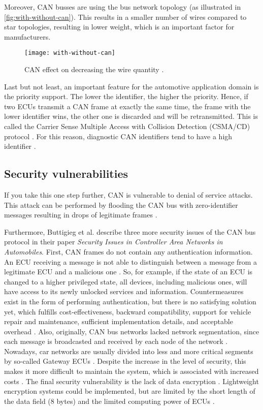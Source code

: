 Moreover, CAN busses are using the bus network topology (as illustrated in \autoref{fig:with-without-can}). This results in a smaller number of wires compared to star topologies, resulting in lower weight, which is an important factor for manufacturers.

\begin{figure}[htb]
    \centering
    \texttt{[image: with-without-can]}
    \caption{CAN effect on decreasing the wire quantity \cite{Sharma2016}.}
    \label{fig:with-without-can}
\end{figure}

Last but not least, an important feature for the automotive application domain is the priority support. The lower the identifier, the higher the priority. Hence, if two ECUs transmit a CAN frame at exactly the same time, the frame with the lower identifier wins, the other one is discarded and will be retransmitted. This is called the Carrier Sense Multiple Access with Collision Detection (CSMA/CD) protocol \cite{Sharma2016}. For this reason, diagnostic CAN identifiers tend to have a high identifier \cite{Herrewegen2018}.

\subsection{Security vulnerabilities}

If you take this one step further, CAN is vulnerable to denial of service attacks. This attack can be performed by flooding the CAN bus with zero-identifier messages resulting in drops of legitimate frames \cite{Buttigieg2017}.

Furthermore, Buttigieg et al. \cite{Buttigieg2017} describe three more security issues of the CAN bus protocol in their paper \emph{Security Issues in Controller Area Networks in Automobiles}.
First, CAN frames do not contain any authentication information. An ECU receiving a message is not able to distinguish between a message from a legitimate ECU and a malicious one \cite{Buttigieg2017}. So, for example, if the state of an ECU is changed to a higher privileged state, all devices, including malicious ones, will have access to its newly unlocked services and information. Countermeasures exist in the form of performing authentication, but there is no satisfying solution yet, which fulfills cost-effectiveness, backward compatibility, support for vehicle repair and maintenance, sufficient implementation details, and acceptable overhead \cite{Bozdal2020}.
Also, originally, CAN bus networks lacked network segmentation, since each message is broadcasted and received by each node of the network \cite{Buttigieg2017}. Nowadays, car networks are usually divided into less and more critical segments by so-called Gateway ECUs \cite{Bozdal2020}. Despite the increase in the level of security, this makes it more difficult to maintain the system, which is associated with increased costs \cite{Bozdal2020}.
The final security vulnerability is the lack of data encryption \cite{Buttigieg2017}. Lightweight encryption systems could be implemented, but are limited by the short length of the data field (8 bytes) and the limited computing power of ECUs \cite{Bozdal2020}.

